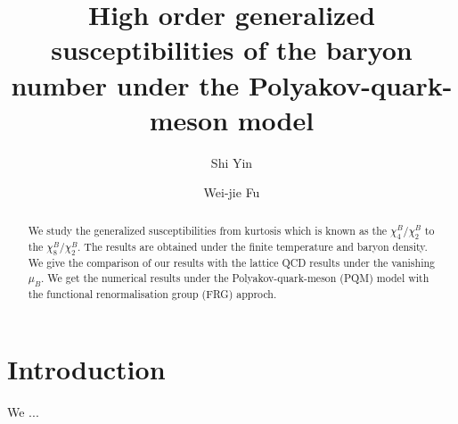 \documentclass[%
reprint,
superscriptaddress,
showpacs,preprintnumbers,
 amsmath,amssymb,
 aps,
prd,
]{revtex4-1}
\begin{document}
\preprint{}

\title{High order generalized susceptibilities of the baryon number under the Polyakov-quark-meson model
}

\author{Shi Yin}


\author{Wei-jie Fu}


\begin{abstract}
We study the generalized susceptibilities from kurtosis which is known as the $\chi^B_4/\chi^B_2$ to the $\chi^B_8/\chi^B_2$. The results are obtained under the finite temperature and baryon density. We give the comparison of our results with the lattice QCD results under the vanishing $\mu_B$. We get the numerical results under the Polyakov-quark-meson (PQM) model with the functional renormalisation group (FRG) approch.


\end{abstract}
\maketitle
\section{Introduction}
\label{sec:int}
We ...

\end{document}
